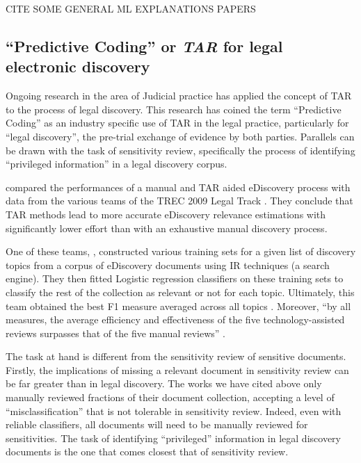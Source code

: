 \documentclass{l4proj}
\begin{document}
CITE SOME GENERAL ML EXPLANATIONS PAPERS

\subsection{``Predictive Coding'' or \textit{TAR} for legal electronic discovery}

Ongoing research in the area of Judicial practice has applied the concept of TAR to the process of legal discovery.
This research has coined the term ``Predictive Coding'' \autocite{carrollGrossmancormackGlossaryTechnologyassisted2013} as an industry specific use of TAR in the legal practice, particularly for ``legal discovery'', the pre-trial exchange of evidence by both parties.
Parallels can be drawn with the task of sensitivity review, specifically the process of identifying ``privileged information'' in a legal discovery corpus.

\textcite{grossmanTechnologyAssistedReviewEDiscovery2010} compared the performances of a manual and TAR aided eDiscovery process with data from the various teams of the TREC 2009 Legal Track \autocite{hedinOverviewTREC2009}.
They conclude that TAR methods lead to more accurate eDiscovery relevance estimations with significantly lower effort than with an exhaustive manual discovery process.


One of these teams, \textcite{cormackMachineLearningInformation2009}, constructed various training sets for a given list of discovery topics from a corpus of eDiscovery documents using IR techniques (a search engine).
They then fitted Logistic regression classifiers on these training sets to classify the rest of the collection as relevant or not for each topic.
Ultimately, this team obtained the best F1 measure averaged across all topics \autocite{hedinOverviewTREC2009}.
Moreover, ``by all measures, the average efficiency and effectiveness of the five technology-assisted reviews surpasses that of the five manual reviews'' \autocite[p.~43]{grossmanTechnologyAssistedReviewEDiscovery2010}.

The task at hand is different from the sensitivity review of sensitive documents.
Firstly, the implications of missing a relevant document in sensitivity review can be far greater than in legal discovery.
The works we have cited above only manually reviewed fractions of their document collection, accepting a level of ``misclassification'' that is not tolerable in sensitivity review.
Indeed, even with reliable classifiers, all documents will need to be manually reviewed for sensitivities.
The task of identifying ``privileged'' information in legal discovery documents is the one that comes closest that of sensitivity review.
\end{document}
